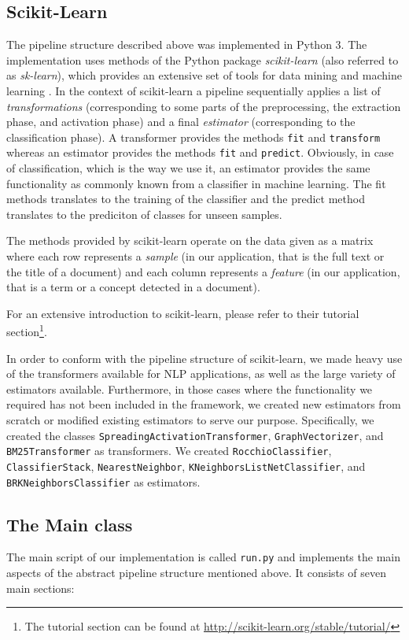 \documentclass{article}
\begin{document}
  \subsection{Scikit-Learn}
The pipeline structure described above was implemented in Python 3. The implementation
uses methods of the Python package \textit{scikit-learn} (also referred to as \textit{sk-learn}),
which provides an extensive set of tools for
data mining and machine learning \cite{scikit-learn}. In the context of
scikit-learn a pipeline sequentially applies a list of \textit{transformations} (corresponding
to some parts of the preprocessing, the extraction phase, and activation phase) and a
final \textit{estimator} (corresponding to
the classification phase). A transformer provides the methods \texttt{fit} and \texttt{transform}
whereas an estimator provides the methods \texttt{fit} and \texttt{predict}. Obviously, in case of classification,
which is the way we use it, an estimator provides the same functionality as commonly known from a classifier in machine
learning. The fit methods translates to the training of the classifier and the predict method translates to
the prediciton of classes for unseen samples.

The methods provided
by scikit-learn operate on the data given as a matrix where each row
represents a \textit{sample} (in our application, that is the full text or the title of a document) and
each column represents a \textit{feature} (in our application, that is a term or a concept detected in a
document).

For an extensive introduction to scikit-learn, please refer to their tutorial section\footnote{The tutorial section can be
found at \url{http://scikit-learn.org/stable/tutorial/}}.

In order to conform with the pipeline structure of scikit-learn, we made heavy use of the transformers available
for NLP applications, as well as the large variety of estimators available. Furthermore, in those cases where the
functionality we required has not been included in the framework, we created new estimators from scratch or modified
existing estimators to serve our purpose. Specifically, we created the classes \texttt{SpreadingActivationTransformer}, \texttt{GraphVectorizer},
and \texttt{BM25Transformer} as transformers. We created \texttt{RocchioClassifier}, \texttt{ClassifierStack}, \texttt{NearestNeighbor},
\texttt{KNeighborsListNetClassifier}, and \texttt{BRKNeighborsClassifier} as estimators.
\subsection{The Main class}
The main script of our implementation is called \texttt{run.py} and implements the main aspects of the
abstract pipeline structure mentioned above. It consists of seven main sections:
\end{document}
